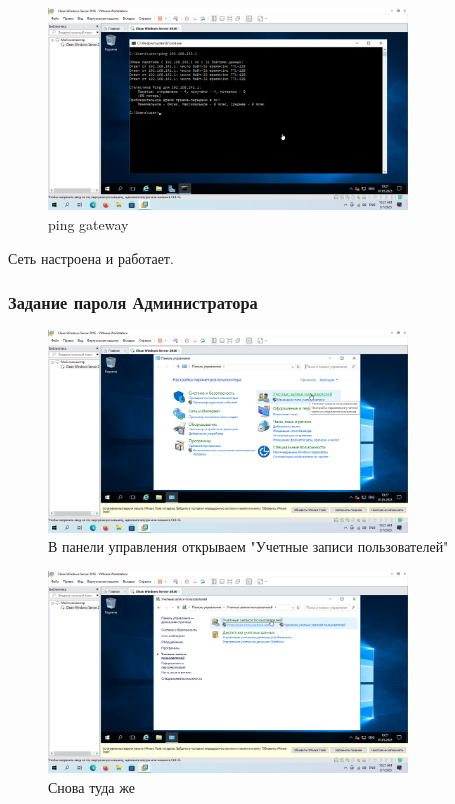 \documentclass[a4paper]{article}
\begin{document}
  \begin{figure}[H]
    \centering
    \includegraphics[width=0.85\textwidth]{9_0023}
    \caption{ping gateway}
    \label{img:0023}
  \end{figure}

  Сеть настроена и работает.

  \subsubsection{Задание пароля Администратора}

  \begin{figure}[H]
    \centering
    \includegraphics[width=0.85\textwidth]{9_0024}
    \caption{В панели управления открываем "Учетные записи пользователей"}
    \label{img:0024}
  \end{figure}

  \begin{figure}[H]
    \centering
    \includegraphics[width=0.85\textwidth]{9_0025}
    \caption{Снова туда же}
    \label{img:0025}
  \end{figure}
\end{document}
